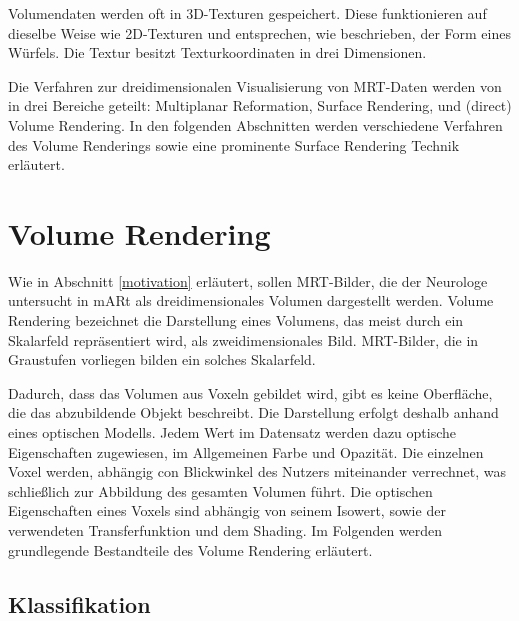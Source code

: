 Volumendaten werden oft in 3D-Texturen gespeichert. Diese funktionieren auf dieselbe Weise wie 2D-Texturen und entsprechen, wie beschrieben, der Form eines Würfels. Die Textur besitzt Texturkoordinaten in drei Dimensionen.

Die Verfahren zur dreidimensionalen Visualisierung von MRT-Daten werden von \cite{Zhang10} in drei Bereiche geteilt: Multiplanar Reformation, Surface Rendering, und (direct) Volume Rendering.  In den folgenden Abschnitten werden verschiedene Verfahren des Volume Renderings sowie eine prominente Surface Rendering Technik erläutert.

\section{Volume Rendering}							  %

Wie in Abschnitt \ref{motivation} erläutert, sollen MRT-Bilder, die der Neurologe untersucht in mARt als dreidimensionales Volumen dargestellt werden. Volume Rendering bezeichnet die Darstellung eines Volumens, das meist durch ein Skalarfeld repräsentiert wird, als zweidimensionales Bild. MRT-Bilder, die in Graustufen vorliegen bilden ein solches Skalarfeld. 

Dadurch, dass das Volumen aus Voxeln gebildet wird, gibt es keine Oberfläche, die das abzubildende Objekt beschreibt. Die Darstellung erfolgt deshalb anhand eines optischen Modells. Jedem Wert im Datensatz werden dazu optische Eigenschaften zugewiesen, im Allgemeinen Farbe und Opazität. %
Die einzelnen Voxel werden, abhängig con Blickwinkel des Nutzers miteinander verrechnet, was schließlich zur Abbildung des gesamten Volumen führt.
Die optischen Eigenschaften eines Voxels sind abhängig von seinem Isowert, sowie der verwendeten Transferfunktion und dem Shading. 
Im Folgenden werden grundlegende Bestandteile des Volume Rendering erläutert.%

\cite{Kaufman03}
\cite{kniss02}

\subsection{Klassifikation}
\label{klassifikation}

